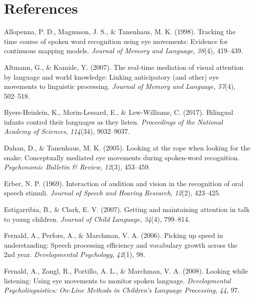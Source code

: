 \documentclass[english,floatsintext,man]{apa6}
\begin{document}
\newpage

\hypertarget{references}{%
\section{References}\label{references}}

\setlength{\parindent}{-0.5in}
\setlength{\leftskip}{0.5in}

\hypertarget{refs}{}
\leavevmode\hypertarget{ref-allopenna1998tracking}{}%
Allopenna, P. D., Magnuson, J. S., \& Tanenhaus, M. K. (1998). Tracking
the time course of spoken word recognition using eye movements: Evidence
for continuous mapping models. \emph{Journal of Memory and Language},
\emph{38}(4), 419--439.

\leavevmode\hypertarget{ref-altmann2007real}{}%
Altmann, G., \& Kamide, Y. (2007). The real-time mediation of visual
attention by language and world knowledge: Linking anticipatory (and
other) eye movements to linguistic processing. \emph{Journal of Memory
and Language}, \emph{57}(4), 502--518.

\leavevmode\hypertarget{ref-byers2017bilingual}{}%
Byers-Heinlein, K., Morin-Lessard, E., \& Lew-Williams, C. (2017).
Bilingual infants control their languages as they listen.
\emph{Proceedings of the National Academy of Sciences}, \emph{114}(34),
9032--9037.

\leavevmode\hypertarget{ref-dahan2005looking}{}%
Dahan, D., \& Tanenhaus, M. K. (2005). Looking at the rope when looking
for the snake: Conceptually mediated eye movements during spoken-word
recognition. \emph{Psychonomic Bulletin \& Review}, \emph{12}(3),
453--459.

\leavevmode\hypertarget{ref-erber1969interaction}{}%
Erber, N. P. (1969). Interaction of audition and vision in the
recognition of oral speech stimuli. \emph{Journal of Speech and Hearing
Research}, \emph{12}(2), 423--425.

\leavevmode\hypertarget{ref-estigarribia2007getting}{}%
Estigarribia, B., \& Clark, E. V. (2007). Getting and maintaining
attention in talk to young children. \emph{Journal of Child Language},
\emph{34}(4), 799--814.

\leavevmode\hypertarget{ref-fernald2006picking}{}%
Fernald, A., Perfors, A., \& Marchman, V. A. (2006). Picking up speed in
understanding: Speech processing efficiency and vocabulary growth across
the 2nd year. \emph{Developmental Psychology}, \emph{42}(1), 98.

\leavevmode\hypertarget{ref-fernald2008looking}{}%
Fernald, A., Zangl, R., Portillo, A. L., \& Marchman, V. A. (2008).
Looking while listening: Using eye movements to monitor spoken language.
\emph{Developmental Psycholinguistics: On-Line Methods in Children's
Language Processing}, \emph{44}, 97.
\end{document}
